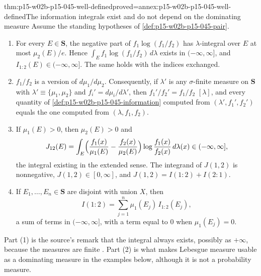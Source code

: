 \begin{hblemma}{thm:p15-w02b-p15-045-well-defined}{proved=annex:p15-w02b-p15-045-well-defined}{The information integrals exist and do not depend on the dominating measure}
Assume the standing hypotheses of \cref{def:p15-w02b-p15-045-pair}.
\begin{enumerate}
\item For every \(E\in\mathbf S\), the negative part of
\(f_1\log(f_1/f_2)\) has \(\lambda\)-integral over \(E\) at most
\(\mu_2(E)/e\). Hence \(\int_Ef_1\log(f_1/f_2)\,d\lambda\) exists in
\((-\infty,\infty]\), and \(I_{1:2}(E)\in(-\infty,\infty]\). The same
holds with the indices exchanged.
\item \(f_1/f_2\) is a version of \(d\mu_1/d\mu_2\). Consequently, if
\(\lambda'\) is any \(\sigma\)-finite measure on \(\mathbf S\) with
\(\lambda'\equiv\{\mu_1,\mu_2\}\) and \(f_i'=d\mu_i/d\lambda'\), then
\(f_1'/f_2'=f_1/f_2\) \([\lambda]\), and every quantity of
\cref{def:p15-w02b-p15-045-information} computed from
\((\lambda',f_1',f_2')\) equals the one computed from
\((\lambda,f_1,f_2)\).
\item If \(\mu_1(E)>0\), then \(\mu_2(E)>0\) and
\[
  J_{12}(E)=\int_E\Bigl(\frac{f_1(x)}{\mu_1(E)}-\frac{f_2(x)}{\mu_2(E)}\Bigr)
             \log\frac{f_1(x)}{f_2(x)}\,d\lambda(x)\in(-\infty,\infty],
\]
the integral existing in the extended sense. The integrand of
\(J(1,2)\) is nonnegative, \(J(1,2)\in[0,\infty]\), and
\(J(1,2)=I(1:2)+I(2:1)\).
\item If \(E_1,\dots,E_n\in\mathbf S\) are disjoint with union \(X\),
then
\[
  I(1:2)=\sum_{j=1}^n\mu_1(E_j)\,I_{1:2}(E_j),
\]
a sum of terms in \((-\infty,\infty]\), with a term equal to \(0\)
when \(\mu_1(E_j)=0\).
\end{enumerate}
\end{hblemma}

Part (1) is the source's remark that the integral always exists,
possibly as \(+\infty\), because the measures are finite
\cite[p.~80]{KullbackLeibler1951Information}. Part (2) is what makes
Lebesgue measure usable as a dominating measure in the examples below,
although it is not a probability measure.

